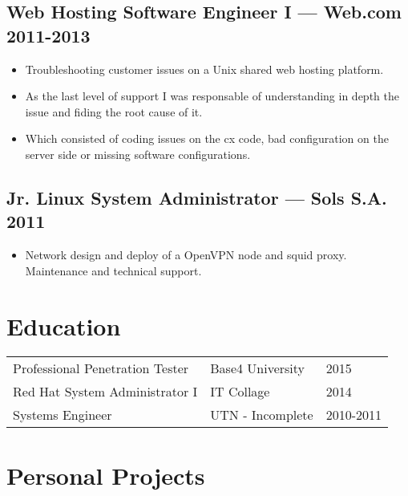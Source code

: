 \documentclass[11pt]{article}
\begin{document}
\subsection{Web Hosting Software Engineer I --- Web.com \hfill 2011-2013}
\begin{itemize}
  \setlength{\parskip}{0pt}
  \setlength{\itemsep}{0pt plus 1pt}
\item Troubleshooting customer issues on a Unix shared web hosting platform.
\item As the last level of support I was responsable of understanding in depth the issue and fiding the root cause of it.
\item Which consisted of coding issues on the cx code, bad configuration on the server side or missing software configurations.
\end{itemize}

\subsection{Jr. Linux System Administrator --- Sols S.A. \hfill 2011}
\begin{itemize}
  \setlength{\parskip}{0pt}
  \setlength{\itemsep}{0pt plus 1pt}
\item Network design and deploy of a OpenVPN node and squid proxy. Maintenance and technical support.
\end{itemize}


\section{Education}


\begin{tabular}{@{}lll@{}}
  \hspace{.1em} Professional Penetration Tester & Base4 University & 2015 \\
  \hspace{.1em} Red Hat System Administrator I  & IT Collage       & 2014 \\
  \hspace{.1em} Systems Engineer                & UTN - Incomplete & 2010-2011\\
\end{tabular}


\section{Personal Projects}
\end{document}
